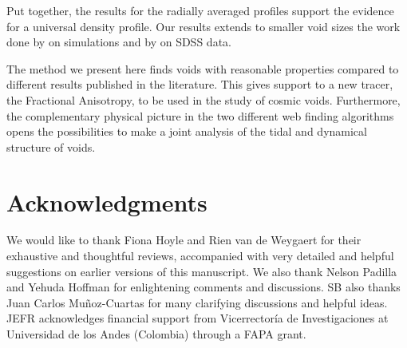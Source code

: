 \documentclass[a4,useAMS,usenatbib,usegraphicx]{mn2e}
\begin{document}
Put together, the results for the radially averaged profiles support the 
evidence for a universal density profile.  
Our results extends to smaller void sizes the work done by
\cite{Hamaus14} on simulations and by \cite{Ceccarelli13} on SDSS data.  


The method we present here finds voids with reasonable properties
compared to different results published in the literature. 
This gives support to a new tracer, the Fractional Anisotropy, to be
used in the study of cosmic voids. 
Furthermore, the complementary physical picture in the two different
web finding algorithms opens the possibilities to make a joint
analysis of the tidal and dynamical structure of voids. 


\section*{Acknowledgments}  


We would like to thank Fiona Hoyle and Rien van de Weygaert for their
exhaustive and thoughtful reviews, accompanied with very detailed and
helpful suggestions on earlier versions of this manuscript.  
We also thank Nelson Padilla and Yehuda Hoffman for enlightening
comments and discussions.
SB also thanks Juan Carlos Mu\~noz-Cuartas 
for many clarifying discussions and helpful ideas.
JEFR acknowledges financial support from Vicerrector\'ia de
Investigaciones at Universidad de los Andes (Colombia) through a FAPA
grant. 



\end{document}
